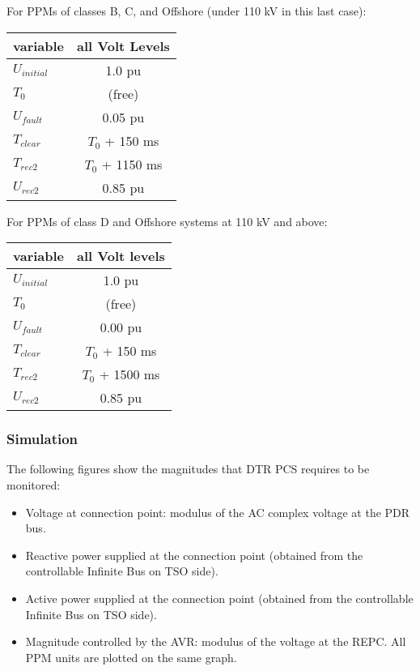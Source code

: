     For PPMs of classes B, C, and Offshore (under 110 kV in this last case):
    \begin{center}
        \begin{tabular}{lc}
            \toprule
            \textbf{variable} & \textbf{all Volt Levels} \\
            \midrule
            $U_{initial}$     & 1.0 pu                   \\
            $T_{0}$           & (free)                   \\
            $U_{fault}$       & 0.05 pu                  \\
            $T_{clear}$       & $T_{0}$ + 150 ms         \\
            $T_{rec2}$        & $T_{0}$ + 1150 ms        \\
            $U_{rec2}$        & 0.85 pu                  \\
            \bottomrule
        \end{tabular}
    \end{center}

    For PPMs of class D and Offshore systems at 110 kV and above:
    \begin{center}
        \begin{tabular}{lc}
            \toprule
            \textbf{variable} & \textbf{all Volt levels} \\
            \midrule
            $U_{initial}$     & 1.0 pu                   \\
            $T_{0}$           & (free)                   \\
            $U_{fault}$       & 0.00 pu                  \\
            $T_{clear}$       & $T_{0}$ + 150 ms         \\
            $T_{rec2 }$       & $T_{0}$ + 1500 ms        \\
            $U_{rec2}$        & 0.85 pu                  \\
            \bottomrule
        \end{tabular}
    \end{center}


    \subsubsection{Simulation}
    The following figures show the magnitudes that DTR PCS \DTRPcs
    requires to be monitored:
    \begin{itemize}
        \item Voltage at connection point: modulus of the AC complex voltage at
        the PDR bus.
        \item Reactive power supplied at the connection point (obtained from
        the controllable Infinite Bus on TSO side).
        \item Active power supplied at the connection point (obtained from
        the controllable Infinite Bus on TSO side).
        \item Magnitude controlled by the AVR: modulus of the voltage at the REPC.
        All PPM units are plotted on the same graph.
    \end{itemize}

